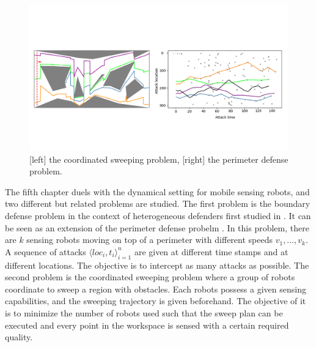 \begin{figure}[h]
    \centering
    \vspace{-.8in}
    \includegraphics[width=.8\textwidth]{figures/dynamic-intro.png}
    \vspace{-.5in}
    \caption[Illustration of sweeping and boundary defense]{[left] the coordinated sweeping problem, [right] the perimeter defense problem.}
    \label{fig:intro-bd-sc}
\end{figure}

The fifth chapter duels with the dynamical setting for mobile sensing robots, 
and two different but related problems are studied. 
The first problem is the boundary defense problem in the context of heterogeneous defenders first studied in \cite{adler2022role}.
It can be seen as an extension of the perimeter defense probelm \cite{shishika2020review}. 
In this problem, there are $k$ sensing robots moving on top of a perimeter with different speeds $v_1,\dots,v_k$.
A sequence of attacks $\langle loc_i, t_i \rangle_{i=1}^{n}$ are given at different time stamps and at different locations.
The objective is to intercept as many attacks as possible.
The second problem is the coordinated sweeping problem where a group of robots coordinate to sweep a region 
with obstacles. Each robots possess a given sensing capabilities, and the sweeping trajectory is 
given beforehand. The objective of it is to minimize the number of robots used such that the sweep plan 
can be executed and every point in the workspace is sensed with a certain required quality. 

